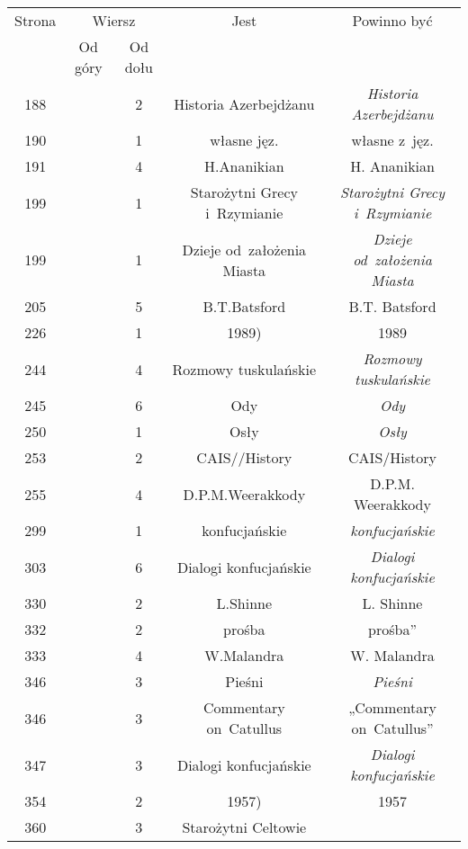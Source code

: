 \documentclass[a4paper,11pt]{article}
\numberwithin{equation}{section}
\begin{document}
\begin{center}
  \begin{tabular}{|c|c|c|c|c|}
    \hline
    Strona & \multicolumn{2}{c|}{Wiersz} & Jest
    & Powinno być \\ \cline{2-3}
    & Od góry & Od dołu & & \\
    \hline
    188 & & \hphantom{0}2 & Historia Azerbejdżanu
    & \textit{Historia Azerbejdżanu} \\
    190 & & \hphantom{0}1 & własne jęz. & własne z~jęz. \\
    191 & & \hphantom{0}4 & H.Ananikian & H. Ananikian \\
    199 & & \hphantom{0}1 & Starożytni Grecy i~Rzymianie
    & \textit{Starożytni Grecy i~Rzymianie} \\
    199 & & \hphantom{0}1 & Dzieje od~założenia Miasta
           & \textit{Dzieje od~założenia Miasta} \\
    205 & & \hphantom{0}5 & B.T.Batsford & B.T. Batsford \\
    226 & & \hphantom{0}1 & 1989) & 1989 \\
    244 & & \hphantom{0}4 & Rozmowy tuskulańskie
    & \textit{Rozmowy tuskulańskie} \\
    245 & & \hphantom{0}6 & Ody & \textit{Ody} \\
    250 & & \hphantom{0}1 & Osły & \textit{Osły} \\
    253 & & \hphantom{0}2 & CAIS//History & CAIS/History \\
    255 & & \hphantom{0}4 & D.P.M.Weerakkody & D.P.M. Weerakkody \\
    299 & & \hphantom{0}1 & konfucjańskie & \textit{konfucjańskie} \\
    303 & & \hphantom{0}6 & Dialogi konfucjańskie
    & \textit{Dialogi konfucjańskie} \\
    330 & & \hphantom{0}2 & L.Shinne & L. Shinne \\
    332 & & \hphantom{0}2 & prośba & prośba'' \\
    333 & & \hphantom{0}4 & W.Malandra & W. Malandra \\
    346 & & \hphantom{0}3 & Pieśni & \textit{Pieśni} \\
    346 & & \hphantom{0}3 & Commentary on~Catullus
    & „Commentary on~Catullus” \\
    347 & & \hphantom{0}3 & Dialogi konfucjańskie
    & \textit{Dialogi konfucjańskie} \\
    354 & & \hphantom{0}2 & 1957) & 1957 \\
    360 & & \hphantom{0}3 & Starożytni Celtowie

\end{tabular}
\end{center}
\end{document}
